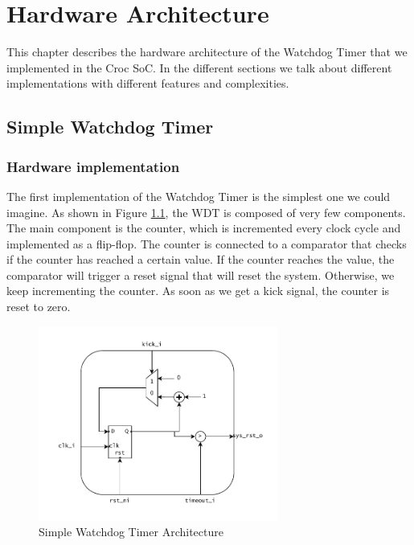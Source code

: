 
\chapter{Hardware Architecture}
This chapter describes the hardware architecture of the Watchdog Timer that we implemented in the Croc SoC.
In the different sections we talk about different implementations with different features and complexities.

\section{Simple Watchdog Timer}
\subsection{Hardware implementation}
The first implementation of the Watchdog Timer is the simplest one we could imagine. 
As shown in Figure \ref{fig:simple_WDT}, the WDT is composed of
very few components. The main component is the counter, which is
incremented every clock cycle and implemented as a flip-flop. The counter is connected to a comparator
that checks if the counter has reached a certain value. If the counter
reaches the value, the comparator will trigger a reset signal that will
reset the system. Otherwise, we keep incrementing the counter. As soon as we get
a kick signal, the counter is reset to zero.

\begin{figure}[h]
\centering
\includegraphics[width=0.7\textwidth]{./figures/simple_WDT}
\caption{Simple Watchdog Timer Architecture}
\label{fig:simple_WDT}
\end{figure}

